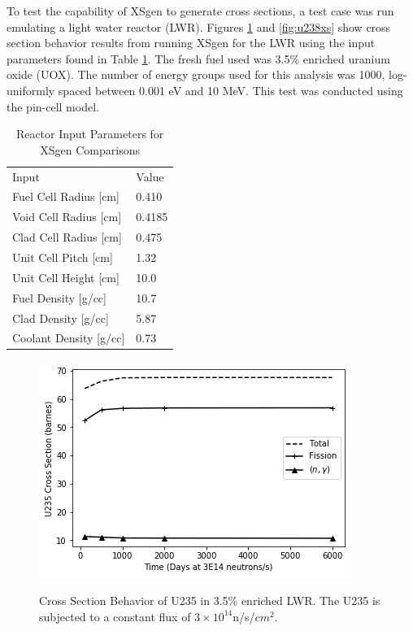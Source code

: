\documentclass{article}
\begin{document}
To test the capability of XSgen to generate cross sections, a test case was run emulating a light water reactor (LWR). 
Figures \ref{fig:u235xs} and \ref{fig:u238xs} show cross section behavior results
from running XSgen for the LWR using the input parameters found in
Table \ref{tab:xsgenstats1}. The fresh fuel used was 3.5\% enriched uranium oxide (UOX).
The number of energy groups used for this analysis was 1000, log-uniformly spaced between
0.001 eV and 10 MeV. This test was conducted using the pin-cell model\cite{pin-cell}. 

\begin{table}[!htb]
\centering
\caption{Reactor Input Parameters for XSgen Comparisons}
\label{tab:xsgenstats1}
\begin{tabular}{ll}
Input & Value \\
Fuel Cell Radius [cm] & 0.410 \\
Void Cell Radius [cm] & 0.4185 \\
Clad Cell Radius [cm] & 0.475 \\
Unit Cell Pitch  [cm] & 1.32 \\
Unit Cell Height [cm] & 10.0 \\
Fuel Density [g/cc] & 10.7 \\
Clad Density [g/cc] & 5.87 \\
Coolant Density [g/cc] & 0.73 \\
\end{tabular}
\end{table}

\begin{figure}
\caption{Cross Section Behavior of U235 in 3.5\% enriched LWR.
         The U235 is subjected to a constant flux of $3\times10^{14}$n/s/$cm^2$.}
\includegraphics[scale=0.8]{U235xs.png}
\label{fig:u235xs}
\end{figure}
\end{document}
